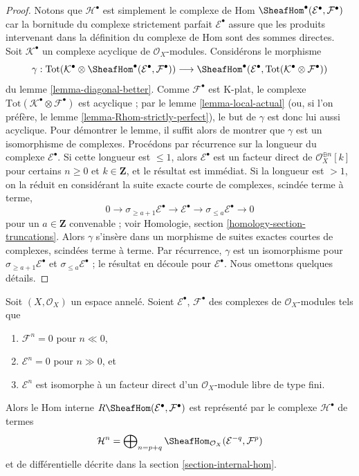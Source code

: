 {\begin{proof}
Notons que $\mathcal{H}^\bullet$ est simplement le complexe de Hom
$\SheafHom^\bullet(\mathcal{E}^\bullet, \mathcal{F}^\bullet)$
car la bornitude du complexe strictement parfait
$\mathcal{E}^\bullet$ assure que les produits intervenant dans la définition du complexe de Hom sont des sommes directes. Soit $\mathcal{K}^\bullet$ un complexe acyclique de
$\mathcal{O}_X$-modules. Considérons le morphisme
$$
\gamma :
\text{Tot}(\mathcal{K}^\bullet \otimes
\SheafHom^\bullet(\mathcal{E}^\bullet, \mathcal{F}^\bullet))
\longrightarrow
\SheafHom^\bullet(\mathcal{E}^\bullet,
\text{Tot}(\mathcal{K}^\bullet \otimes \mathcal{F}^\bullet))
$$
du lemme \ref{lemma-diagonal-better}. Comme $\mathcal{F}^\bullet$ est K-plat, le complexe $\text{Tot}(\mathcal{K}^\bullet \otimes \mathcal{F}^\bullet)$
est acyclique ; par le lemme \ref{lemma-local-actual}
(ou, si l'on préfère, le lemme \ref{lemma-Rhom-strictly-perfect}), le but de $\gamma$ est donc lui aussi acyclique. Pour démontrer le lemme, il suffit alors de montrer que $\gamma$ est un isomorphisme de complexes. Procédons par récurrence sur la longueur du complexe $\mathcal{E}^\bullet$. Si cette longueur est $\leq 1$, alors $\mathcal{E}^\bullet$
est un facteur direct de $\mathcal{O}_X^{\oplus n}[k]$ pour certains
$n \geq 0$ et $k \in \mathbf{Z}$, et le résultat est immédiat. Si la longueur est $> 1$, on la réduit en considérant la suite exacte courte de complexes, scindée terme à terme,
$$
0 \to \sigma_{\geq a + 1} \mathcal{E}^\bullet \to
\mathcal{E}^\bullet \to
\sigma_{\leq a} \mathcal{E}^\bullet \to 0
$$
pour un $a \in \mathbf{Z}$ convenable ; voir Homologie, section \ref{homology-section-truncations}. Alors $\gamma$ s'insère dans un morphisme de suites exactes courtes de complexes, scindées terme à terme. Par récurrence, $\gamma$ est un isomorphisme pour
$\sigma_{\geq a + 1} \mathcal{E}^\bullet$
et $\sigma_{\leq a} \mathcal{E}^\bullet$ ; le résultat en découle pour
$\mathcal{E}^\bullet$. Nous omettons quelques détails.

\end{proof}

\begin{lemma}

\label{lemma-Rhom-complex-of-direct-summands-finite-free}
Soit $(X, \mathcal{O}_X)$ un espace annelé. Soient $\mathcal{E}^\bullet$, $\mathcal{F}^\bullet$ des complexes de $\mathcal{O}_X$-modules tels que
\begin{enumerate}
\item $\mathcal{F}^n = 0$ pour $n \ll 0$,
\item $\mathcal{E}^n = 0$ pour $n \gg 0$, et
\item $\mathcal{E}^n$ est isomorphe à un facteur direct d'un $\mathcal{O}_X$-module libre de type fini.
\end{enumerate}
Alors le Hom interne $R\SheafHom(\mathcal{E}^\bullet, \mathcal{F}^\bullet)$ est représenté par le complexe $\mathcal{H}^\bullet$ de termes $$
\mathcal{H}^n =
\bigoplus\nolimits_{n = p + q}
\SheafHom_{\mathcal{O}_X}(\mathcal{E}^{-q}, \mathcal{F}^p)
$$ et de différentielle décrite dans la section \ref{section-internal-hom}.
\end{lemma}

}
